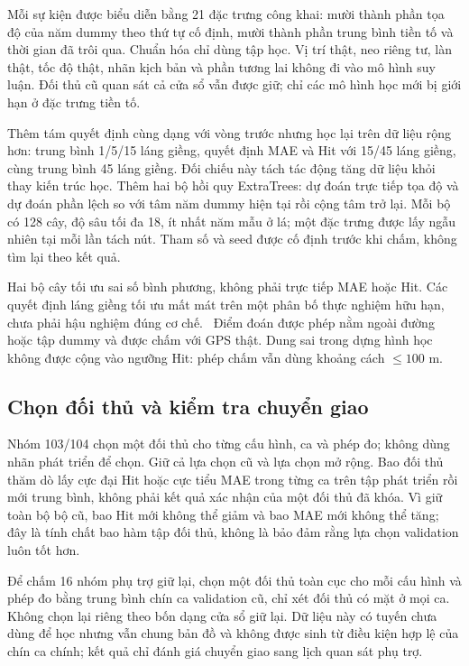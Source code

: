 Mỗi sự kiện được biểu diễn bằng 21 đặc trưng công khai: mười thành phần tọa độ của năm dummy theo thứ tự cố định, mười thành phần trung bình tiền tố và thời gian đã trôi qua. Chuẩn hóa chỉ dùng tập học. Vị trí thật, neo riêng tư, làn thật, tốc độ thật, nhãn kịch bản và phần tương lai không đi vào mô hình suy luận. Đối thủ cũ quan sát cả cửa sổ vẫn được giữ; chỉ các mô hình học mới bị giới hạn ở đặc trưng tiền tố.

Thêm tám quyết định cùng dạng với vòng trước nhưng học lại trên dữ liệu rộng hơn: trung bình 1/5/15 láng giềng, quyết định MAE và Hit với 15/45 láng giềng, cùng trung bình 45 láng giềng. Đối chiếu này tách tác động tăng dữ liệu khỏi thay kiến trúc học. Thêm hai bộ hồi quy ExtraTrees: dự đoán trực tiếp tọa độ và dự đoán phần lệch so với tâm năm dummy hiện tại rồi cộng tâm trở lại. Mỗi bộ có 128 cây, độ sâu tối đa 18, ít nhất năm mẫu ở lá; một đặc trưng được lấy ngẫu nhiên tại mỗi lần tách nút. Tham số và seed được cố định trước khi chấm, không tìm lại theo kết quả.

Hai bộ cây tối ưu sai số bình phương, không phải trực tiếp MAE hoặc Hit. Các quyết định láng giềng tối ưu mất mát trên một phân bố thực nghiệm hữu hạn, chưa phải hậu nghiệm đúng cơ chế.~\citep{shokri2015privacygames} Điểm đoán được phép nằm ngoài đường hoặc tập dummy và được chấm với GPS thật. Dung sai trong dựng hình học không được cộng vào ngưỡng Hit: phép chấm vẫn dùng khoảng cách $\leq100$ m.

\subsection{Chọn đối thủ và kiểm tra chuyển giao}

Nhóm 103/104 chọn một đối thủ cho từng cấu hình, ca và phép đo; không dùng nhãn phát triển để chọn. Giữ cả lựa chọn cũ và lựa chọn mở rộng. Bao đối thủ thăm dò lấy cực đại Hit hoặc cực tiểu MAE trong từng ca trên tập phát triển rồi mới trung bình, không phải kết quả xác nhận của một đối thủ đã khóa. Vì giữ toàn bộ bộ cũ, bao Hit mới không thể giảm và bao MAE mới không thể tăng; đây là tính chất bao hàm tập đối thủ, không là bảo đảm rằng lựa chọn validation luôn tốt hơn.

Để chấm 16 nhóm phụ trợ giữ lại, chọn một đối thủ toàn cục cho mỗi cấu hình và phép đo bằng trung bình chín ca validation cũ, chỉ xét đối thủ có mặt ở mọi ca. Không chọn lại riêng theo bốn dạng cửa sổ giữ lại. Dữ liệu này có tuyến chưa dùng để học nhưng vẫn chung bản đồ và không được sinh từ điều kiện hợp lệ của chín ca chính; kết quả chỉ đánh giá chuyển giao sang lịch quan sát phụ trợ.

